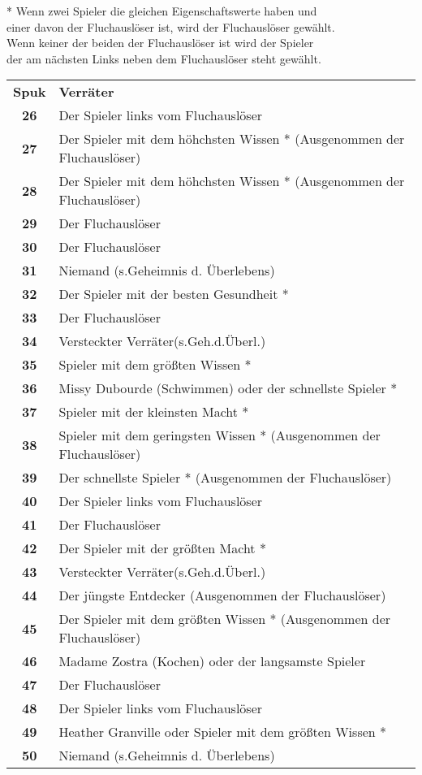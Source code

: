 \begin{landscape}
\begin{multicols}{2}
\vspace{0.5cm}
* Wenn zwei Spieler die gleichen Eigenschaftswerte haben und \\ einer davon der Fluchauslöser ist, wird der Fluchauslöser gewählt. \\
Wenn keiner der beiden der Fluchauslöser ist wird der Spieler \\ der am nächsten Links neben dem Fluchauslöser steht gewählt.
\end{multicols}



\end{landscape}




\begin{tabular}{cl}
\textbf{Spuk} & \textbf{Verräter} \\
\bf 26 & Der Spieler links vom Fluchauslöser \\
\bf 27 & Der Spieler mit dem höhchsten Wissen * (Ausgenommen der Fluchauslöser) \\
\bf 28 & Der Spieler mit dem höhchsten Wissen * (Ausgenommen der Fluchauslöser) \\
\bf 29 & Der Fluchauslöser \\
\bf 30 & Der Fluchauslöser \\
\bf 31 & Niemand (s.Geheimnis d. Überlebens) \\
\bf 32 & Der Spieler mit der besten Gesundheit * \\
\bf 33 & Der Fluchauslöser \\
\bf 34 & Versteckter Verräter(s.Geh.d.Überl.) \\
\bf 35 & Spieler mit dem größten Wissen * \\
\bf 36 & Missy Dubourde (Schwimmen) oder der schnellste Spieler * \\
\bf 37 & Spieler mit der kleinsten Macht * \\
\bf 38 & Spieler mit dem geringsten Wissen * (Ausgenommen der Fluchauslöser) \\
\bf 39 & Der schnellste Spieler * (Ausgenommen der Fluchauslöser) \\
\bf 40 & Der Spieler links vom Fluchauslöser \\
\bf 41 & Der Fluchauslöser \\
\bf 42 & Der Spieler mit der größten Macht * \\
\bf 43 & Versteckter Verräter(s.Geh.d.Überl.) \\
\bf 44 & Der jüngste Entdecker (Ausgenommen der Fluchauslöser) \\
\bf 45 & Der Spieler mit dem größten Wissen * (Ausgenommen der Fluchauslöser) \\
\bf 46 & Madame Zostra (Kochen) oder der langsamste Spieler \\
\bf 47 & Der Fluchauslöser \\
\bf 48 & Der Spieler links vom Fluchauslöser \\
\bf 49 & Heather Granville oder Spieler mit dem größten Wissen * \\
\bf 50 & Niemand (s.Geheimnis d. Überlebens) \\




\end{tabular}
